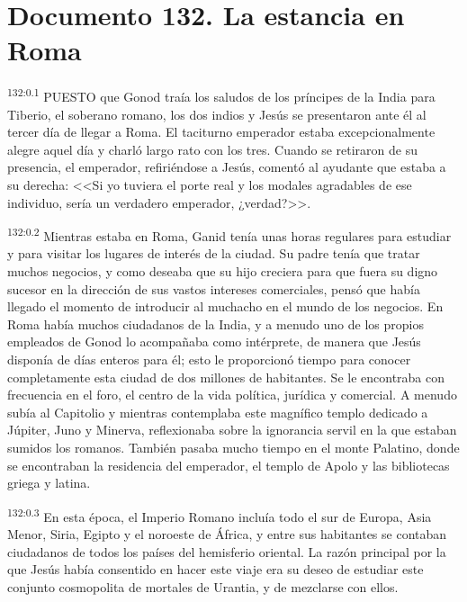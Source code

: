 \chapter{Documento 132. La estancia en Roma}
\par 
\textsuperscript{132:0.1} PUESTO que Gonod traía los saludos de los príncipes de la India para Tiberio, el soberano romano, los dos indios y Jesús se presentaron ante él al tercer día de llegar a Roma. El taciturno emperador estaba excepcionalmente alegre aquel día y charló largo rato con los tres. Cuando se retiraron de su presencia, el emperador, refiriéndose a Jesús, comentó al ayudante que estaba a su derecha: <<Si yo tuviera el porte real y los modales agradables de ese individuo, sería un verdadero emperador, ¿verdad?>>.

\par 
\textsuperscript{132:0.2} Mientras estaba en Roma, Ganid tenía unas horas regulares para estudiar y para visitar los lugares de interés de la ciudad. Su padre tenía que tratar muchos negocios, y como deseaba que su hijo creciera para que fuera su digno sucesor en la dirección de sus vastos intereses comerciales, pensó que había llegado el momento de introducir al muchacho en el mundo de los negocios. En Roma había muchos ciudadanos de la India, y a menudo uno de los propios empleados de Gonod lo acompañaba como intérprete, de manera que Jesús disponía de días enteros para él; esto le proporcionó tiempo para conocer completamente esta ciudad de dos millones de habitantes. Se le encontraba con frecuencia en el foro, el centro de la vida política, jurídica y comercial. A menudo subía al Capitolio y mientras contemplaba este magnífico templo dedicado a Júpiter, Juno y Minerva, reflexionaba sobre la ignorancia servil en la que estaban sumidos los romanos. También pasaba mucho tiempo en el monte Palatino, donde se encontraban la residencia del emperador, el templo de Apolo y las bibliotecas griega y latina.

\par 
\textsuperscript{132:0.3} En esta época, el Imperio Romano incluía todo el sur de Europa, Asia Menor, Siria, Egipto y el noroeste de África, y entre sus habitantes se contaban ciudadanos de todos los países del hemisferio oriental. La razón principal por la que Jesús había consentido en hacer este viaje era su deseo de estudiar este conjunto cosmopolita de mortales de Urantia, y de mezclarse con ellos.

